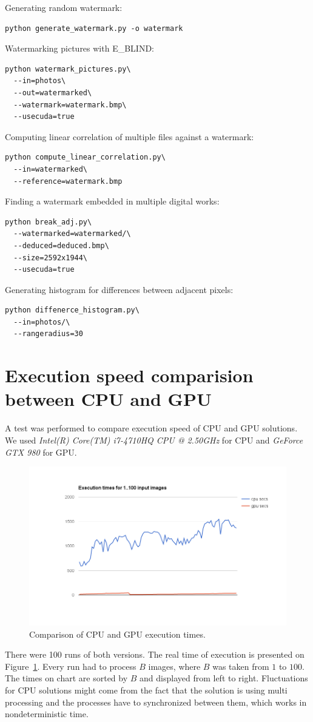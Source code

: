\documentclass[a4paper,12pt]{article}
\begin{document}
Generating random watermark:
\begin{lstlisting}
python generate_watermark.py -o watermark
\end{lstlisting}
Watermarking pictures with E\_BLIND:
\begin{lstlisting}
python watermark_pictures.py\
  --in=photos\
  --out=watermarked\
  --watermark=watermark.bmp\
  --usecuda=true
\end{lstlisting}
Computing linear correlation of multiple files against a watermark:
\begin{lstlisting}
python compute_linear_correlation.py\
  --in=watermarked\
  --reference=watermark.bmp
\end{lstlisting}
Finding a watermark embedded in multiple digital works:
\begin{lstlisting}
python break_adj.py\
  --watermarked=watermarked/\
  --deduced=deduced.bmp\
  --size=2592x1944\
  --usecuda=true
\end{lstlisting}
Generating histogram for differences between adjacent pixels:
\begin{lstlisting}
python diffenerce_histogram.py\
  --in=photos/\
  --rangeradius=30
\end{lstlisting}


\section{Execution speed comparision between CPU and GPU}

A test was performed to compare execution speed of CPU and GPU solutions. 
We used \textit{Intel(R) Core(TM) i7-4710HQ CPU @ 2.50GHz} for CPU and
\textit{GeForce GTX 980} for GPU.
\begin{figure}[ht!]
  \centering
    \includegraphics[width=1.0\textwidth]{../../images/time-benchmark.png}
  \caption{Comparison of CPU and GPU execution times.}
  \label{time-benchmark}
\end{figure}
There were 100 runs of both versions. The real time of execution is presented on
Figure~\ref{time-benchmark}. Every run had to process $B$ images, where $B$ was
taken from $1$ to $100$. The times on chart are sorted by $B$ and
displayed from left to right. Fluctuations for CPU solutions might come from the
fact that the solution is using multi processing and the processes have to
synchronized between them, which works in nondeterministic time.
\end{document}
